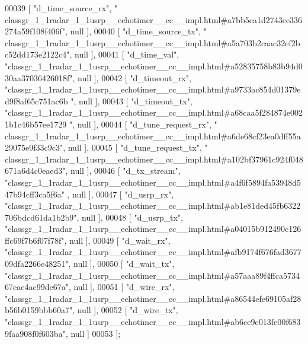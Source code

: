 \begin{DoxyCode}
00039     [ \textcolor{stringliteral}{"d\_time\_source\_rx"}, \textcolor{stringliteral}{"
      classgr\_1\_1radar\_1\_1usrp\_\_echotimer\_\_cc\_\_impl.html#a7bb5ca1d2743ee336274a59f108f406f"}, null ],
00040     [ \textcolor{stringliteral}{"d\_time\_source\_tx"}, \textcolor{stringliteral}{"
      classgr\_1\_1radar\_1\_1usrp\_\_echotimer\_\_cc\_\_impl.html#a5a703b2caac32ef2bc52dd173e2122c4"}, null ],
00041     [ \textcolor{stringliteral}{"d\_time\_val"}, \textcolor{stringliteral}{"classgr\_1\_1radar\_1\_1usrp\_\_echotimer\_\_cc\_\_impl.html#a52835758b83b94d030aa37036426018f"},
       null ],
00042     [ \textcolor{stringliteral}{"d\_timeout\_rx"}, \textcolor{stringliteral}{"classgr\_1\_1radar\_1\_1usrp\_\_echotimer\_\_cc\_\_impl.html#a9733ac854d01379ed9f8af65c751ac6b
      "}, null ],
00043     [ \textcolor{stringliteral}{"d\_timeout\_tx"}, \textcolor{stringliteral}{"classgr\_1\_1radar\_1\_1usrp\_\_echotimer\_\_cc\_\_impl.html#a68caa5f284874e0021b1c46b57ee1729
      "}, null ],
00044     [ \textcolor{stringliteral}{"d\_tune\_request\_rx"}, \textcolor{stringliteral}{"
      classgr\_1\_1radar\_1\_1usrp\_\_echotimer\_\_cc\_\_impl.html#a6de68cf23ea0dff55a29075e9f33c9c3"}, null ],
00045     [ \textcolor{stringliteral}{"d\_tune\_request\_tx"}, \textcolor{stringliteral}{"
      classgr\_1\_1radar\_1\_1usrp\_\_echotimer\_\_cc\_\_impl.html#a102bf37961c924f048671a6d4c0eaed3"}, null ],
00046     [ \textcolor{stringliteral}{"d\_tx\_stream"}, \textcolor{stringliteral}{"classgr\_1\_1radar\_1\_1usrp\_\_echotimer\_\_cc\_\_impl.html#a4f6f5894fa53948d547b94cff3ca5f6a"}
      , null ],
00047     [ \textcolor{stringliteral}{"d\_usrp\_rx"}, \textcolor{stringliteral}{"classgr\_1\_1radar\_1\_1usrp\_\_echotimer\_\_cc\_\_impl.html#ab1e81ded45fb6322706bdcd61da1b2b9"}, 
      null ],
00048     [ \textcolor{stringliteral}{"d\_usrp\_tx"}, \textcolor{stringliteral}{"classgr\_1\_1radar\_1\_1usrp\_\_echotimer\_\_cc\_\_impl.html#a04015b912490c126ffc69f7b6f07f78f"}, 
      null ],
00049     [ \textcolor{stringliteral}{"d\_wait\_rx"}, \textcolor{stringliteral}{"classgr\_1\_1radar\_1\_1usrp\_\_echotimer\_\_cc\_\_impl.html#afb9174f676fad367709dfa2266e48251"}, 
      null ],
00050     [ \textcolor{stringliteral}{"d\_wait\_tx"}, \textcolor{stringliteral}{"classgr\_1\_1radar\_1\_1usrp\_\_echotimer\_\_cc\_\_impl.html#a57aaa89f4ffca573467eae4ac99de67a"}, 
      null ],
00051     [ \textcolor{stringliteral}{"d\_wire\_rx"}, \textcolor{stringliteral}{"classgr\_1\_1radar\_1\_1usrp\_\_echotimer\_\_cc\_\_impl.html#a86544efe69105af28b56b0159bbb60a7"}, 
      null ],
00052     [ \textcolor{stringliteral}{"d\_wire\_tx"}, \textcolor{stringliteral}{"classgr\_1\_1radar\_1\_1usrp\_\_echotimer\_\_cc\_\_impl.html#ab6ce9e013fe00f6839faa908f0f603ba"}, 
      null ]
00053 ];
\end{DoxyCode}
